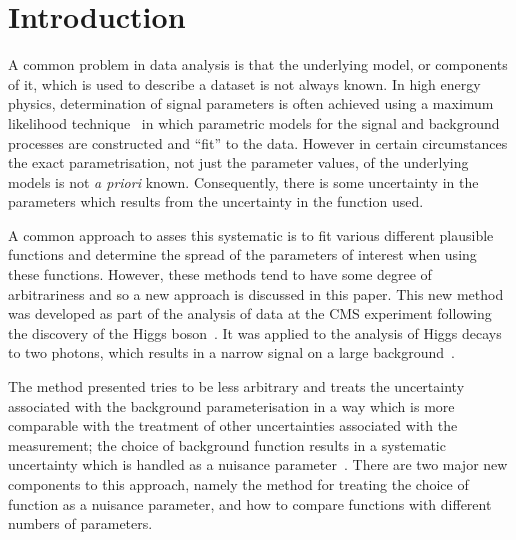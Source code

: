 \section{Introduction} %
\label{sec:introduction}


A common problem in data analysis is that the underlying model, or components of it, which is used to describe a dataset
is not always known. In high energy physics, determination of signal parameters is
often achieved using a maximum likelihood technique~\cite{ref:Fisher01011922}
in which parametric models for the signal and background processes are constructed and
``fit'' to the data. However in certain circumstances the exact parametrisation, not just the parameter
values, of the underlying models is not {\it a priori} known. Consequently, there is some uncertainty in the parameters which results from the uncertainty in the function used.

A common approach to asses this systematic is to fit various different plausible functions and
determine the spread of the parameters of interest when using these functions.
However, these methods tend to have some degree of arbitrariness and so
a new approach is discussed in this paper.
This new method was developed as part of the analysis of data at the CMS experiment
following the discovery of the Higgs
boson~\cite{ref:introduction:atlasdis,ref:introduction:cmsdis}.
It was applied to the analysis of Higgs decays to two photons, which
results in a narrow signal on a large
background~\cite{ref:introduction:legacy}.

The method presented tries to be less
arbitrary and treats the uncertainty associated with the
background parameterisation in a way
which is more comparable with the treatment of other
uncertainties associated with the measurement; the choice of background
function results in a systematic uncertainty
which is handled as a nuisance parameter~\cite{ref:intro:nusiances}.
There are two major new components to this approach, namely the method for
treating the choice of function as a nuisance parameter, and how to compare
functions with different numbers of parameters.

